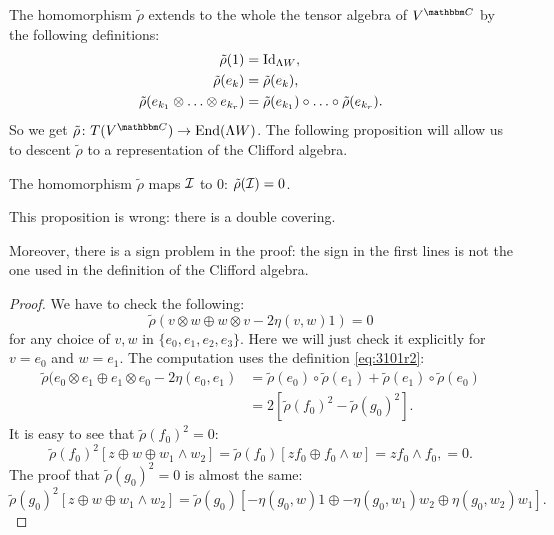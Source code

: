 The homomorphism $\tilde\rho$ extends to the whole the tensor algebra of $V^{\eC}$ by the following definitions:
\begin{subequations}
\begin{align}
 \tilde\rho(1)              &=\operatorname{Id}_{\Lambda W},\\
 \tilde\rho(e_k)            &=\tilde\rho(e_k),\\
 \tilde\rho(e_{k_1}\otimes\ldots\otimes e_{k_r})&=
                      \tilde\rho(e_{k_1})\circ\ldots\circ\tilde\rho(e_{k_r}).\label{eq:3101r2}
\end{align}
\end{subequations}
So we get $\dpt{\tilde\rho}{T(V^{\eC})}{\End(\Lambda W)}$.  The following proposition will allow us to descent $\tilde\rho$ to a representation of the Clifford algebra.

\begin{proposition}
The homomorphism $\tilde\rho$ maps $\mathcal{I}$ to $0$: $\tilde\rho(\mathcal{I})=0$.
\end{proposition}

\begin{probleme}
This proposition is wrong: there is a double covering.

Moreover, there is a sign problem in the proof: the sign in the first lines is not the one used in the definition of the Clifford algebra.
\end{probleme}


\begin{proof}
We have to check the following:
\[\tilde\rho(v\otimes w\oplus w\otimes v-2\eta(v,w)1)=0\]
for any choice of
 $v,w$ in $\{e_0,e_1,e_2,e_3\}$.
  Here we will just check it explicitly for $v=e_0$ and $w=e_1$. The computation uses the definition \eqref{eq:3101r2}:
\begin{equation}
\begin{split}
\tilde\rho(e_0\otimes e_1\oplus e_1\otimes
             e_0-2\eta(e_0,e_1)&=\tilde\rho(e_0)\circ\tilde\rho(e_1)+\tilde\rho(e_1)\circ\tilde\rho(e_0)\\
                               &=2\left[\tilde\rho(f_0)^2-\tilde\rho(g_0)^2\right].
\end{split}
\end{equation}
It is easy to see that $\tilde\rho(f_0)^2=0$:
\begin{equation}
 \tilde\rho(f_0)^2\left[z\oplus w\oplus w_1\wedge w_2 \right]=\tilde\rho(f_0)[zf_0\oplus f_0\wedge w]
                                                   =zf_0\wedge f_0,
							=0.
\end{equation}
 The proof that $\tilde\rho(g_0)^2=0$ is almost the same:
\[ 
 \tilde\rho(g_0)^2\left[z\oplus w\oplus w_1\wedge w_2 \right]
 =\tilde\rho(g_0)[-\eta(g_0,w)1\oplus-\eta(g_0,w_1)w_2\oplus\eta(g_0,w_2)w_1].
\]

\end{proof}


